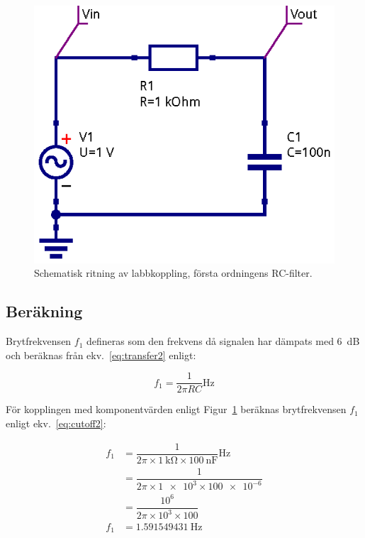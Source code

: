 \begin{figure}\label{fig:rc-schema}
  \centering
  \includegraphics[width=0.8\linewidth]{sim/ee466_lab-4_prj/uppgift-0_schema}
  \caption[Schematisk ritning av labbkoppling, första ordningens RC-filter.]
  {Schematisk ritning av labbkoppling, första ordningens RC-filter.}
\end{figure}


\subsection{Beräkning}
Brytfrekvensen $f_1$ defineras som den frekvens då signalen har dämpats med
\SI{6}{\dB} och beräknas från ekv.~\eqref{eq:transfer2} enligt:

\begin{equation}\label{eq:cutoff}
  f_1 = \dfrac{1}{2 \pi R C} \si{\Hz}
\end{equation}

För kopplingen med komponentvärden enligt Figur~\ref{fig:rc-schema} beräknas
brytfrekvensen $f_1$ enligt ekv.~\eqref{eq:cutoff2}:

\begin{equation}\label{eq:cutoff2}
  \begin{split}
    f_1 &= \dfrac{1}{2    \pi \times \SI{1}{\kohm} \times \SI{100}{\nano\farad}} \si{\Hz} \\
        &= \dfrac{1}{2    \pi \times \num{1e3} \times \num{100e-6}}                       \\
        &= \dfrac{10^6}{2 \pi \times 10^3 \times \num{100}}                               \\
    f_1 &= \SI{1.591549431}{\Hz}
  \end{split}
\end{equation}

